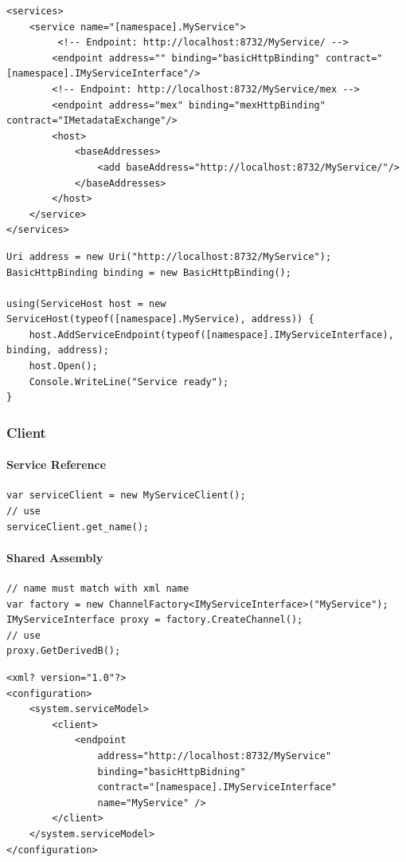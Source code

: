 \documentclass[
a4paper,
oneside,
10pt,
fleqn,
headsepline,
toc=listofnumbered, 
bibliography=totocnumbered]{scrartcl}
\begin{document}
\begin{lstlisting}[caption=Service Hosting via XML]
<services>
	<service name="[namespace].MyService">
		 <!-- Endpoint: http://localhost:8732/MyService/ -->
		<endpoint address="" binding="basicHttpBinding" contract="[namespace].IMyServiceInterface"/>
		<!-- Endpoint: http://localhost:8732/MyService/mex -->
		<endpoint address="mex" binding="mexHttpBinding"  contract="IMetadataExchange"/> 
		<host>
			<baseAddresses>
				<add baseAddress="http://localhost:8732/MyService/"/>
			</baseAddresses>
		</host>
	</service>
</services>
\end{lstlisting}

\clearpage

\begin{lstlisting}[caption=Service Hosting via Code]
Uri address = new Uri("http://localhost:8732/MyService");
BasicHttpBinding binding = new BasicHttpBinding();

using(ServiceHost host = new ServiceHost(typeof([namespace].MyService), address)) {
	host.AddServiceEndpoint(typeof([namespace].IMyServiceInterface), binding, address);
	host.Open();
	Console.WriteLine("Service ready");
}
\end{lstlisting}

\subsubsection{Client}
\paragraph{Service Reference}
\begin{lstlisting}
var serviceClient = new MyServiceClient();
// use
serviceClient.get_name(); 
\end{lstlisting}

\paragraph{Shared Assembly}
\begin{lstlisting}
// name must match with xml name
var factory = new ChannelFactory<IMyServiceInterface>("MyService");
IMyServiceInterface proxy = factory.CreateChannel();
// use
proxy.GetDerivedB();
\end{lstlisting}



\begin{lstlisting}
<xml? version="1.0"?>
<configuration>
	<system.serviceModel>
		<client>
			<endpoint
				address="http://localhost:8732/MyService"
				binding="basicHttpBidning"
				contract="[namespace].IMyServiceInterface"
				name="MyService" />
		</client>
	</system.serviceModel>
</configuration>
\end{lstlisting}
\end{document}
